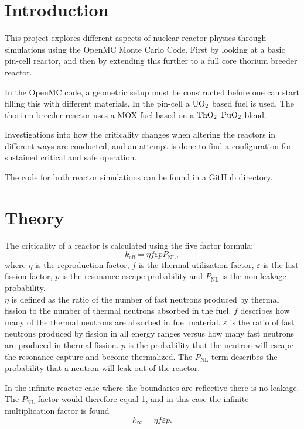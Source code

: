 \documentclass[norsk,a4paper,12pt]{article}
\begin{document}
\setlength{\columnsep}{20pt}
\begin{multicols}{2}

\section{Introduction}
This project explores different aspects of nuclear reactor physics through simulations using the OpenMC Monte Carlo Code\cite{openmc}. First by looking at a basic pin-cell reactor, and then by extending this further to a full core thorium breeder reactor.

In the OpenMC code, a geometric setup must be constructed before one can start filling this with different materials. In the pin-cell a $\ce{UO_2}$ based fuel is used. The thorium breeder reactor uses a MOX fuel based on a $\ce{ThO_2}$-$\ce{PuO_2}$ blend. 

Investigations into how the criticality changes when altering the reactors in different ways are conducted, and an attempt is done to find a configuration for sustained critical and safe operation. 

The code for both reactor simulations can be found in a GitHub directory\cite{githubjulian}.
\section{Theory}
The criticality of a reactor is calculated using the five factor formula;
\begin{equation}
    k_{\text{eff}} = \eta f \varepsilon p P_{\text{NL}} ,
    \label{eq:keff}
\end{equation}
where $\eta$ is the reproduction factor, $f$ is the thermal utilization factor, $\varepsilon$ is the fast fission factor, $p$ is the resonance escape probability and $P_{\text{NL}}$ is the non-leakage probability.
\\
$\eta$ is defined as the ratio of the number of fast neutrons produced by thermal fission to the number of thermal neutrons absorbed in the fuel. $f$ describes how many of the thermal neutrons are absorbed in fuel material. $\varepsilon$ is the ratio of fast neutrons produced by fission in all energy ranges versus how many fast neutrons are produced in thermal fission. $p$ is the probability that the neutron will escape the resonance capture and become thermalized. The $P_{\text{NL}}$ term describes the probability that a neutron will leak out of the reactor.

In the infinite reactor case where the boundaries are reflective there is no leakage. The $P_{\text{NL}}$ factor would therefore equal 1, and in this case the infinite multiplication factor is found
\begin{equation}
    k_{\infty} = \eta f \varepsilon p .
    \label{eq:kinfinity}
\end{equation}





\end{multicols}
\end{document}
